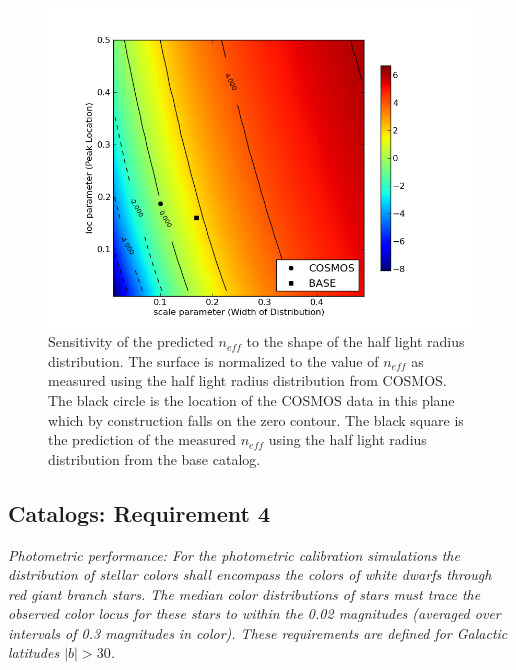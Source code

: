 \documentclass[]{article}
\begin{document}
\begin{figure}[ht]
\centering
\includegraphics[width=5in]{validation_figures/size_sensitivity.png}
\caption{Sensitivity of the predicted $n_{eff}$ to the shape of the half light radius distribution.  
The surface is normalized to the value of $n_{eff}$ as measured using the half light radius distribution from COSMOS.  The black circle
is the location of the COSMOS data in this plane which by construction falls on the zero contour.  The black square is the prediction of
the measured $n_{eff}$ using the half light radius distribution from the base catalog.\label{fig:size_sens}}
\end{figure}

\subsection{Catalogs: Requirement 4}

{\it Photometric performance: For the photometric calibration
  simulations the distribution of stellar colors shall encompass the
  colors of white dwarfs through red giant branch stars.  The median
  color distributions of stars must trace the observed color locus for
  these stars to within the 0.02 magnitudes (averaged over intervals
  of 0.3 magnitudes in color). These requirements are defined for
  Galactic latitudes $|b|>30$.}\\
\end{document}
